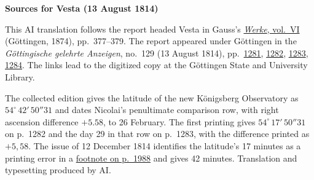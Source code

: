 \clearpage\thispagestyle{empty}
\begin{center}\textbf{Sources for Vesta (13 August 1814)}\end{center}
\noindent This AI translation follows the report headed Vesta in Gauss’s \href{https://gdz.sub.uni-goettingen.de/id/PPN236007467}{\textit{Werke}, vol.~VI} (Göttingen, 1874), pp.~377--379. The report appeared under Göttingen in the \textit{Göttingische gelehrte Anzeigen}, no.~129 (13 August 1814), pp.~\href{https://images.p.sub.uni-goettingen.de/iiif/image/gdz:PPN319721507_1814:00001287/full/1600,/0/default.jpg}{1281}, \href{https://images.p.sub.uni-goettingen.de/iiif/image/gdz:PPN319721507_1814:00001288/full/1600,/0/default.jpg}{1282}, \href{https://images.p.sub.uni-goettingen.de/iiif/image/gdz:PPN319721507_1814:00001289/full/1600,/0/default.jpg}{1283}, \href{https://images.p.sub.uni-goettingen.de/iiif/image/gdz:PPN319721507_1814:00001290/full/1600,/0/default.jpg}{1284}. The links lead to the digitized copy at the Göttingen State and University Library.
\par\smallskip\noindent The collected edition gives the latitude of the new Königsberg Observatory as $54^\circ\,42'\,50''31$ and dates Nicolai’s penultimate comparison row, with right ascension difference $+5.58$, to 26 February. The first printing gives $54^\circ\,17'\,50''31$ on p.~1282 and the day 29 in that row on p.~1283, with the difference printed as $+5{,}58$. The issue of 12 December 1814 identifies the latitude’s 17 minutes as a printing error in a \href{https://images.p.sub.uni-goettingen.de/iiif/image/gdz:PPN319721507_1814:00001996/full/1600,/0/default.jpg}{footnote on p.~1988} and gives 42 minutes. Translation and typesetting produced by AI.
\clearpage
